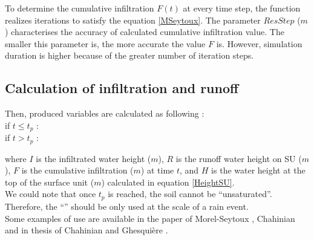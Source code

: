 To determine the cumulative infiltration $F(t)$ at every time step, the function realizes iterations to satisfy the equation \ref{MSeytoux}. The parameter $ResStep$ ($m$) characterises the accuracy of calculated cumulative infiltration value. The smaller this parameter is, the more accurate the value $F$ is. However, simulation duration is higher because of the greater number of iteration steps.


\subsection{Calculation of infiltration and runoff}
Then, produced variables are calculated as following :\\

if $t \le t_p$ : \ \ \ \\
\vspace{-0.5mm}
if $t > t_p$ : \ \ \ 

where $I$ is the infiltrated water height ($m$), $R$ is the runoff water height on SU ($m$), $F$ is the cumulative infiltration ($m$) at time $t$, and $H$ is the water height at the top of the surface unit ($m$) calculated in equation \ref{HeightSU}.\\

We could note that once $t_p$ is reached, the soil cannot be ``unsaturated''. Therefore, the ``\englishname'' should be only used at the scale of a rain event.\\

Some examples of use are available in the paper of Morel-Seytoux \cite{MorelS1984}, Chahinian \cite{Chahinian2004b} and in thesis of Chahinian \cite{Chahinian2004} and Ghesquière \cite{Ghesquiere2008}.
